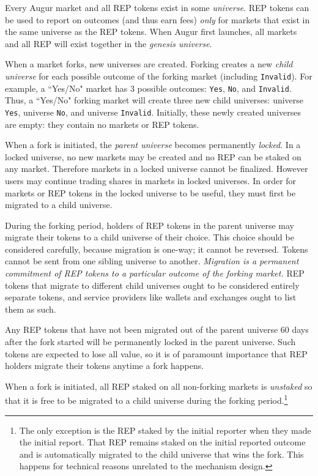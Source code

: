 \documentclass[floatfix,reprint,nofootinbib,amsmath,amssymb,epsfig,pre,floats,letterpaper,groupedaffiliation]{revtex4-1}
\theoremstyle{definition}
\theoremstyle{definition}
\begin{document}
Every Augur market and all REP tokens exist in some \textit{universe}.  REP tokens can be used to report on outcomes (and thus earn fees) \textit{only} for markets that exist in the same universe as the REP tokens.  When Augur first launches, all markets and all REP will exist together in the \textit{genesis universe}.

When a market forks, new universes are created.  Forking creates a new \textit{child universe} for each possible outcome of the forking market (including \texttt{Invalid}).  For example, a ``Yes/No" market has 3 possible outcomes: \texttt{Yes}, \texttt{No}, and \texttt{Invalid}.  Thus, a ``Yes/No" forking market will create three new child universes: universe \texttt{Yes}, universe \texttt{No}, and universe \texttt{Invalid}.  Initially, these newly created universes are empty: they contain no markets or REP tokens.

When a fork is initiated, the \textit{parent universe} becomes permanently \textit{locked}.  In a locked universe, no new markets may be created and no REP can be staked on any market. Therefore markets in a locked universe cannot be finalized. However users may continue trading shares in markets in locked universes.  In order for markets or REP tokens in the locked universe to be useful, they must first be migrated to a child universe.

During the forking period, holders of REP tokens in the parent universe may migrate their tokens to a child universe of their choice.  This choice should be considered carefully, because migration is one-way; it cannot be reversed.  Tokens cannot be sent from one sibling universe to another.  \textit{Migration is a permanent commitment of REP tokens to a particular outcome of the forking market.}  REP tokens that migrate to different child universes ought to be considered entirely separate tokens, and service providers like wallets and exchanges ought to list them as such.

Any REP tokens that have not been migrated out of the parent universe 60 days after the fork started will be permanently locked in the parent universe. Such tokens are expected to lose all value, so it is of paramount importance that REP holders migrate their tokens anytime a fork happens.

When a fork is initiated, all REP staked on all non-forking markets is \textit{unstaked} so that it is free to be migrated to a child universe during the forking period.\footnote{The only exception is the REP staked by the initial reporter when they made the initial report.  That REP remains staked on the initial reported outcome and is automatically migrated to the child universe that wins the fork. This happens for technical reasons unrelated to the mechanism design.}
\end{document}
